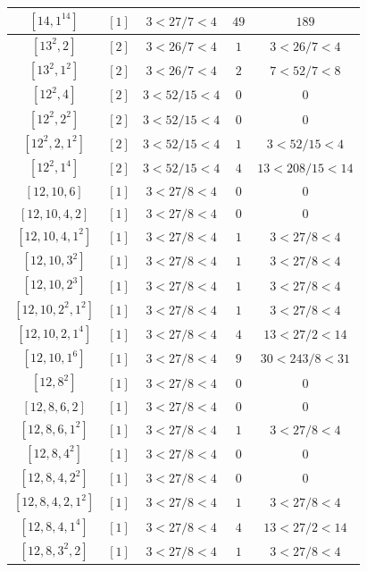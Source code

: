 \documentclass{article}%
\begin{document}
\begin{center}
\begin{longtable}{||c|c|c|c|c||}
$[14, 1^{14}]$ & $[1]$ & $3 < 27/7 < 4$ & $49$ & $189$ \\ \hline 
$[13^{2}, 2]$ & $[2]$ & $3 < 26/7 < 4$ & $1$ & $3 < 26/7 < 4$ \\ \hline 
$[13^{2}, 1^{2}]$ & $[2]$ & $3 < 26/7 < 4$ & $2$ & $7 < 52/7 < 8$ \\ \hline 
$[12^{2}, 4]$ & $[2]$ & $3 < 52/15 < 4$ & $0$ & $0$ \\ \hline 
$[12^{2}, 2^{2}]$ & $[2]$ & $3 < 52/15 < 4$ & $0$ & $0$ \\ \hline 
$[12^{2}, 2, 1^{2}]$ & $[2]$ & $3 < 52/15 < 4$ & $1$ & $3 < 52/15 < 4$ \\ \hline 
$[12^{2}, 1^{4}]$ & $[2]$ & $3 < 52/15 < 4$ & $4$ & $13 < 208/15 < 14$ \\ \hline 
$[12, 10, 6]$ & $[1]$ & $3 < 27/8 < 4$ & $0$ & $0$ \\ \hline 
$[12, 10, 4, 2]$ & $[1]$ & $3 < 27/8 < 4$ & $0$ & $0$ \\ \hline 
$[12, 10, 4, 1^{2}]$ & $[1]$ & $3 < 27/8 < 4$ & $1$ & $3 < 27/8 < 4$ \\ \hline 
$[12, 10, 3^{2}]$ & $[1]$ & $3 < 27/8 < 4$ & $1$ & $3 < 27/8 < 4$ \\ \hline 
$[12, 10, 2^{3}]$ & $[1]$ & $3 < 27/8 < 4$ & $1$ & $3 < 27/8 < 4$ \\ \hline 
$[12, 10, 2^{2}, 1^{2}]$ & $[1]$ & $3 < 27/8 < 4$ & $1$ & $3 < 27/8 < 4$ \\ \hline 
$[12, 10, 2, 1^{4}]$ & $[1]$ & $3 < 27/8 < 4$ & $4$ & $13 < 27/2 < 14$ \\ \hline 
$[12, 10, 1^{6}]$ & $[1]$ & $3 < 27/8 < 4$ & $9$ & $30 < 243/8 < 31$ \\ \hline 
$[12, 8^{2}]$ & $[1]$ & $3 < 27/8 < 4$ & $0$ & $0$ \\ \hline 
$[12, 8, 6, 2]$ & $[1]$ & $3 < 27/8 < 4$ & $0$ & $0$ \\ \hline 
$[12, 8, 6, 1^{2}]$ & $[1]$ & $3 < 27/8 < 4$ & $1$ & $3 < 27/8 < 4$ \\ \hline 
$[12, 8, 4^{2}]$ & $[1]$ & $3 < 27/8 < 4$ & $0$ & $0$ \\ \hline 
$[12, 8, 4, 2^{2}]$ & $[1]$ & $3 < 27/8 < 4$ & $0$ & $0$ \\ \hline 
$[12, 8, 4, 2, 1^{2}]$ & $[1]$ & $3 < 27/8 < 4$ & $1$ & $3 < 27/8 < 4$ \\ \hline 
$[12, 8, 4, 1^{4}]$ & $[1]$ & $3 < 27/8 < 4$ & $4$ & $13 < 27/2 < 14$ \\ \hline 
$[12, 8, 3^{2}, 2]$ & $[1]$ & $3 < 27/8 < 4$ & $1$ & $3 < 27/8 < 4$ \\ \hline 

\end{longtable}
\end{center}
\end{document}

